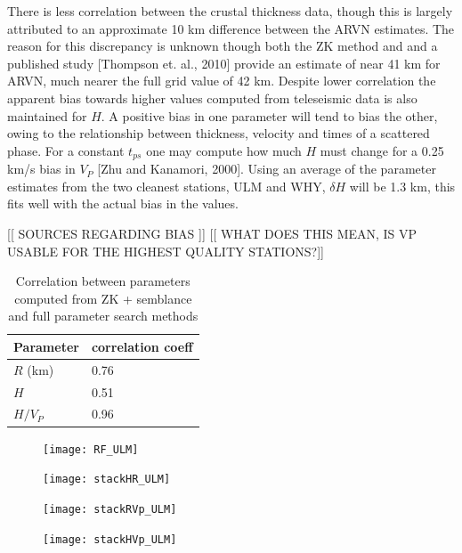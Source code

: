 \documentclass[draft, 12pt]{article}
\begin{document}
There is less correlation between the crustal thickness data, though this is largely attributed to an approximate 10 km difference between the ARVN estimates. The reason for this discrepancy is unknown though both the ZK method and and a published study [Thompson et. al., 2010] provide an estimate of near 41 km for ARVN, much nearer the full grid value of 42 km. Despite lower correlation the apparent bias towards higher values computed from teleseismic data is also maintained for $H$. A positive bias in one parameter will tend to bias the other, owing to the relationship between thickness, velocity and times of a scattered phase. For a constant $t_{ps}$ one may compute how much $H$ must change for a 0.25 km/s bias in $V_P$ [Zhu and Kanamori, 2000]. Using an average of the parameter estimates from the two cleanest stations, ULM and WHY, $\delta H$ will be 1.3 km, this fits well with the actual bias in the values.

[[ SOURCES REGARDING BIAS ]] [[ WHAT DOES THIS MEAN, IS VP USABLE FOR THE HIGHEST QUALITY STATIONS?]]


\begin{table}
  \begin{tabular}{ l l }
    \hline
    Parameter & correlation coeff \\
    \hline
    $R$ (km) &  0.76 \\
    $H$      &  0.51 \\
    $H/V_P$  &  0.96 \\
    \hline
  \end{tabular}
  \caption{Correlation between parameters computed from ZK + semblance and full parameter search methods}
\label{table:ZKvsFG}

\end{table}


\begin{figure}
  \centering
  \texttt{[image: RF\_ULM]}
  \caption{}
  \label{fig:RF_ULM}
\end{figure}

\begin{figure}
  \centering
  \texttt{[image: stackHR\_ULM]}
  \caption{}
  \label{fig:HR_ULM}
\end{figure}

\begin{figure}
  \centering
  \texttt{[image: stackRVp\_ULM]}
  \caption{}
  \label{fig:RVp_ULM}
\end{figure}

\begin{figure}
  \centering
  \texttt{[image: stackHVp\_ULM]}
  \caption{}
  \label{fig:HVp_ULM}
\end{figure}
\end{document}
